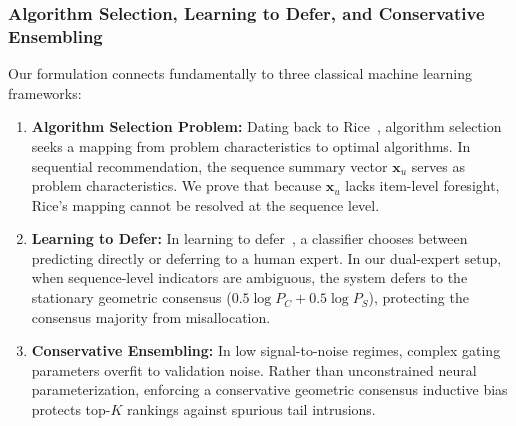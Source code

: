 \subsubsection{Algorithm Selection, Learning to Defer, and Conservative Ensembling}
Our formulation connects fundamentally to three classical machine learning frameworks:
\begin{enumerate}[leftmargin=*]
    \item \textbf{Algorithm Selection Problem:} Dating back to Rice~\cite{rice1976algorithm}, algorithm selection seeks a mapping from problem characteristics to optimal algorithms. In sequential recommendation, the sequence summary vector $\mathbf{x}_u$ serves as problem characteristics. We prove that because $\mathbf{x}_u$ lacks item-level foresight, Rice's mapping cannot be resolved at the sequence level.
    \item \textbf{Learning to Defer:} In learning to defer~\cite{madras2018predict,mozannar2020consistent}, a classifier chooses between predicting directly or deferring to a human expert. In our dual-expert setup, when sequence-level indicators are ambiguous, the system defers to the stationary geometric consensus ($0.5 \log P_C + 0.5 \log P_S$), protecting the consensus majority from misallocation.
    \item \textbf{Conservative Ensembling:} In low signal-to-noise regimes, complex gating parameters overfit to validation noise. Rather than unconstrained neural parameterization, enforcing a conservative geometric consensus inductive bias protects top-$K$ rankings against spurious tail intrusions.
\end{enumerate}
